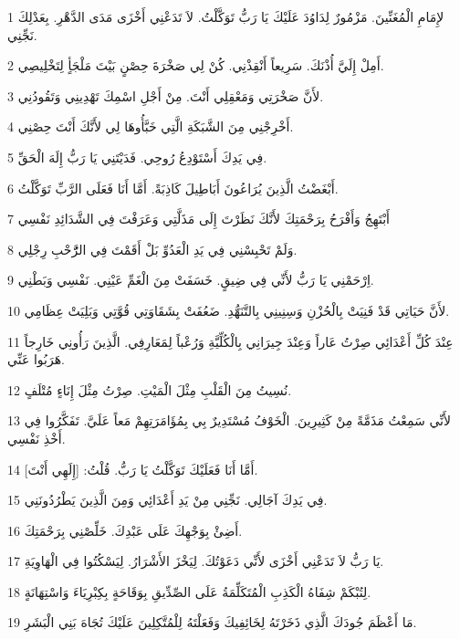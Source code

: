 \par 1 لإِمَامِ الْمُغَنِّينَ. مَزْمُورٌ لِدَاوُدَ عَلَيْكَ يَا رَبُّ تَوَكَّلْتُ. لاَ تَدَعْنِي أَخْزَى مَدَى الدَّهْرِ. بِعَدْلِكَ نَجِّنِي.
\par 2 أَمِلْ إِلَيَّ أُذْنَكَ. سَرِيعاً أَنْقِذْنِي. كُنْ لِي صَخْرَةَ حِصْنٍ بَيْتَ مَلْجَأٍ لِتَخْلِيصِي.
\par 3 لأَنَّ صَخْرَتِي وَمَعْقِلِي أَنْتَ. مِنْ أَجْلِ اسْمِكَ تَهْدِينِي وَتَقُودُنِي.
\par 4 أَخْرِجْنِي مِنَ الشَّبَكَةِ الَّتِي خَبَّأُوهَا لِي لأَنَّكَ أَنْتَ حِصْنِي.
\par 5 فِي يَدِكَ أَسْتَوْدِعُ رُوحِي. فَدَيْتَنِي يَا رَبُّ إِلَهَ الْحَقِّ.
\par 6 أَبْغَضْتُ الَّذِينَ يُرَاعُونَ أَبَاطِيلَ كَاذِبَةً. أَمَّا أَنَا فَعَلَى الرَّبِّ تَوَكَّلْتُ.
\par 7 أَبْتَهِجُ وَأَفْرَحُ بِرَحْمَتِكَ لأَنَّكَ نَظَرْتَ إِلَى مَذَلَّتِي وَعَرَفْتَ فِي الشَّدَائِدِ نَفْسِي
\par 8 وَلَمْ تَحْبِسْنِي فِي يَدِ الْعَدُوِّ بَلْ أَقَمْتَ فِي الرَُّحْبِ رِجْلِي.
\par 9 اِرْحَمْنِي يَا رَبُّ لأَنِّي فِي ضِيقٍ. خَسَفَتْ مِنَ الْغَمِّ عَيْنِي. نَفْسِي وَبَطْنِي.
\par 10 لأَنَّ حَيَاتِي قَدْ فَنِيَتْ بِالْحُزْنِ وَسِنِينِي بِالتَّنَهُّدِ. ضَعُفَتْ بِشَقَاوَتِي قُوَّتِي وَبَلِيَتْ عِظَامِي.
\par 11 عِنْدَ كُلِّ أَعْدَائِي صِرْتُ عَاراً وَعِنْدَ جِيرَانِي بِالْكُلِّيَّةِ وَرُعْباً لِمَعَارِفِي. الَّذِينَ رَأُونِي خَارِجاً هَرَبُوا عَنِّي.
\par 12 نُسِيتُ مِنَ الْقَلْبِ مِثْلَ الْمَيْتِ. صِرْتُ مِثْلَ إِنَاءٍ مُتْلَفٍ.
\par 13 لأَنِّي سَمِعْتُ مَذَمَّةً مِنْ كَثِيرِينَ. الْخَوْفُ مُسْتَدِيرٌ بِي بِمُؤَامَرَتِهِمْ مَعاً عَلَيَّ. تَفَكَّرُوا فِي أَخْذِ نَفْسِي.
\par 14 أَمَّا أَنَا فَعَلَيْكَ تَوَكَّلْتُ يَا رَبُّ. قُلْتُ: [إِلَهِي أَنْتَ].
\par 15 فِي يَدِكَ آجَالِي. نَجِّنِي مِنْ يَدِ أَعْدَائِي وَمِنَ الَّذِينَ يَطْرُدُونَنِي.
\par 16 أَضِئْ بِوَجْهِكَ عَلَى عَبْدِكَ. خَلِّصْنِي بِرَحْمَتِكَ.
\par 17 يَا رَبُّ لاَ تَدَعْنِي أَخْزَى لأَنِّي دَعَوْتُكَ. لِيَخْزَ الأَشْرَارُ. لِيَسْكُتُوا فِي الْهَاوِيَةِ.
\par 18 لِتُبْكَمْ شِفَاهُ الْكَذِبِ الْمُتَكَلِّمَةُ عَلَى الصِّدِّيقِ بِوَقَاحَةٍ بِكِبْرِيَاءَ وَاسْتِهَانَةٍ.
\par 19 مَا أَعْظَمَ جُودَكَ الَّذِي ذَخَرْتَهُ لِخَائِفِيكَ وَفَعَلْتَهُ لِلْمُتَّكِلِينَ عَلَيْكَ تُجَاهَ بَنِي الْبَشَرِ.
